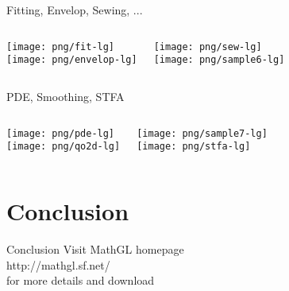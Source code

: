 \documentclass[color=usenames]{beamer}
\begin{document}
\begin{frame}{Fitting, Envelop, Sewing, ...}
\begin{columns}
\texttt{[image: png/fit-lg]}\\
\texttt{[image: png/envelop-lg]}

\texttt{[image: png/sew-lg]}\\
\texttt{[image: png/sample6-lg]}

\end{columns}
\end{frame}

\begin{frame}{PDE, Smoothing, STFA}
\begin{columns}
\texttt{[image: png/pde-lg]}\\
\texttt{[image: png/qo2d-lg]}

\texttt{[image: png/sample7-lg]}\\
\texttt{[image: png/stfa-lg]}

\end{columns}
\end{frame}

\section{Conclusion}
\begin{frame}{Conclusion}
\LARGE
Visit MathGL homepage\\[18pt]

http://mathgl.sf.net/\\[18pt]

for more details and download
\end{frame}
\end{document}

